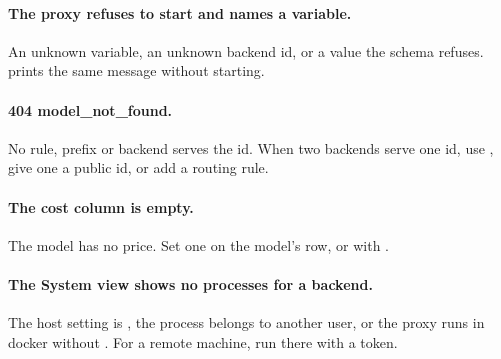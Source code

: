 \paragraph{The proxy refuses to start and names a variable.} An unknown  variable, an unknown backend id, or a value the schema refuses.  prints the same message without starting.

\paragraph{404 model\_not\_found.} No rule, prefix or backend serves the id. When two backends serve one id, use , give one a public id, or add a routing rule.

\paragraph{The cost column is empty.} The model has no price. Set one on the model's row, or with .

\paragraph{The System view shows no processes for a backend.} The host setting is , the process belongs to another user, or the proxy runs in docker without . For a remote machine, run  there with a token.
